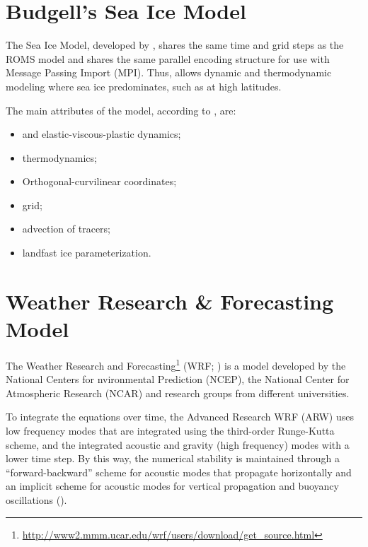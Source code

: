 \section{Budgell's Sea Ice Model}\label{seaicesecao}
\bigskip

 The Sea Ice Model, developed by \textcite{Budgell2005}, shares the same time and grid steps as the ROMS model and shares the same parallel encoding structure 
for use with Message Passing Import (MPI). Thus, allows dynamic and thermodynamic modeling where sea ice predominates, such as at high latitudes.
\bigskip

 The main attributes of the model, according to \textcite{hedstrom2018}, are:
\bigskip
\begin{itemize}
    \item \textcite{Hunke1997} and \textcite{Hunke2001} elastic-viscous-plastic dynamics;
    \item \textcite{Mellor1989} thermodynamics;
    \item Orthogonal-curvilinear coordinates;
    \item \textcite{Arakawa1977} grid;
    \item \textcite{Smolarkiewicz1990} advection of tracers;
    \item \textcite{Lemieux2015} landfast ice parameterization.
\end{itemize}
\bigskip



\section{Weather Research \& Forecasting Model}\label{secaowrf}
\bigskip

 The Weather Research and Forecasting\textcolor{bleu_cite}{\textit{}\footnote{\textcolor{bleu_cite}{\href{http://www2.mmm.ucar.edu/wrf/users/download/get\_source.html}{http://www2.mmm.ucar.edu/wrf/users/download/get\_source.html}}}} 
(WRF; \cite{Skamarock2008}) is a model developed by the National Centers for nvironmental Prediction (NCEP), the National Center for 
Atmospheric Research (NCAR) and research groups from different universities.
\bigskip

 To integrate the equations over time, the Advanced Research WRF (ARW) uses low frequency modes that are integrated using the third-order Runge-Kutta scheme, 
and the integrated acoustic and gravity (high frequency) modes with a lower time step. By this way, the numerical stability is maintained through a “forward-backward” scheme for
acoustic modes that propagate horizontally and an implicit scheme for acoustic modes for vertical propagation and buoyancy oscillations (\cite{Skamarock2008}).
\bigskip

